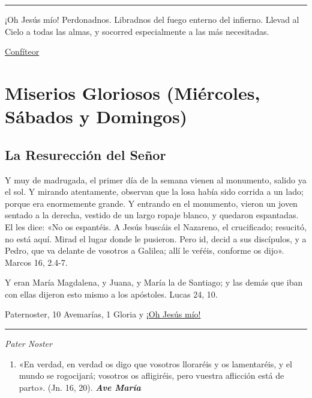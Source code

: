 \documentclass[a4paper,11pt, oneside]{report}
\begin{document}
\begin{center}\rule{1\linewidth}{\linethickness}\end{center}      

\medskip
\hypertarget{finalMuerte}{¡Oh Jesús mío! Perdonadnos. Libradnos del fuego enterno del infierno. Llevad al Cielo a todas las almas, y socorred especialmente a las más 
necesitadas.}

\par\bigskip
\hyperlink{sec:confiteor}{Confíteor}

\section*{Miserios Gloriosos (Miércoles, Sábados y Domingos)}\label{sec:gloriosos}
{
  \subsection*{La Resurección del Señor}
    {
      Y muy de madrugada, el primer día de la semana vienen al monumento, salido ya el sol. Y mirando atentamente, observan que la losa había
      sido corrida a un lado; porque era enormemente grande. Y entrando en el monumento, vieron un joven sentado a la derecha, vestido de un largo
      ropaje blanco, y quedaron espantadas. El les dice: «No os espantéis. A Jesús buscáis el Nazareno, el crucificado; resucitó, no está aquí. Mirad
      el lugar donde le pusieron. Pero id, decid a sus discípulos, y a Pedro, que va delante de vosotros a Galilea; allí le veŕéis, conforme os dijo».
      Marcos 16, 2.4-7.

      \medskip
      Y eran María Magdalena, y Juana, y María la de Santiago; y las demás que iban con ellas dijeron esto mismo a los apóstoles. 
      Lucas 24, 10.

       Paternoster, 10 Avemarías, 1 Gloria y \hyperlink{finalResureccion}{¡Oh Jesús mío!}

      \begin{center}\rule{1\linewidth}{\linethickness}\end{center}

      \medskip
      \textit{Pater Noster}

      \begin{enumerate}
        
        \item «En verdad, en verdad os digo que vosotros lloraréis y os lamentaréis, y el mundo se rogocijará;
        vosotros os afligiréis, pero vuestra aflicción está de parto». (Jn. 16, 20). \textbf{\textit{Ave María}}


\end{enumerate}}}
\end{document}
